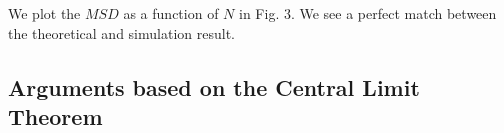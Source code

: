 \documentclass[showpacs,amsmath,amssymb,aps,pre,twocolumn]{revtex4-1}
\def\p{\partial}
\begin{document}
We plot the $MSD$ as a function of $N$ in Fig. 3. We see a perfect match between the theoretical and simulation result. %



\subsection{Arguments based on the Central Limit Theorem }




\end{document}
